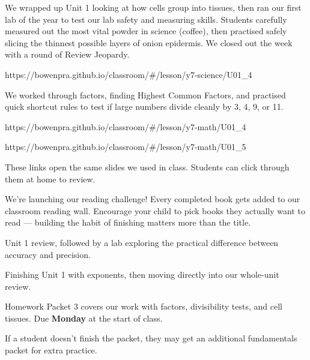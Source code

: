 \documentclass[11pt]{article}
\begin{document}

\begin{annbody}


We wrapped up Unit 1 looking at how cells group into tissues, then ran our first
lab of the year to test our lab safety and measuring skills. Students carefully
measured out the most vital powder in science (coffee), then practised safely
slicing the thinnest possible layers of onion epidermis. We closed out the week
with a round of Review Jeopardy.\par
\vspace{3pt}%
  {https://bowenpra.github.io/classroom/\#/lesson/y7-science/U01\_4}

We worked through factors, finding Highest Common Factors, and practised quick
shortcut rules to test if large numbers divide cleanly by 3, 4, 9, or 11.\par
\vspace{3pt}%
  {https://bowenpra.github.io/classroom/\#/lesson/y7-math/U01\_4}\par
\vspace{3pt}%
  {https://bowenpra.github.io/classroom/\#/lesson/y7-math/U01\_5}

\vspace{5pt}
These links open the same slides we used in class. Students can click through
them at home to review.


We're launching our reading challenge! Every completed book gets added to our
classroom reading wall. Encourage your child to pick books they actually want to
read --- building the habit of finishing matters more than the title.


Unit 1 review, followed by a lab exploring the practical difference between
accuracy and precision.

Finishing Unit 1 with exponents, then moving directly into our whole-unit
review.


Homework Packet 3 covers our work with factors, divisibility tests, and cell
tissues. Due \textbf{Monday} at the start of class.
\par\vspace{4pt}
\par
\vspace{3pt}
\par\vspace{4pt}
If a student doesn't finish the packet, they may get an additional fundamentals
packet for extra practice.


\end{annbody}
\end{document}
